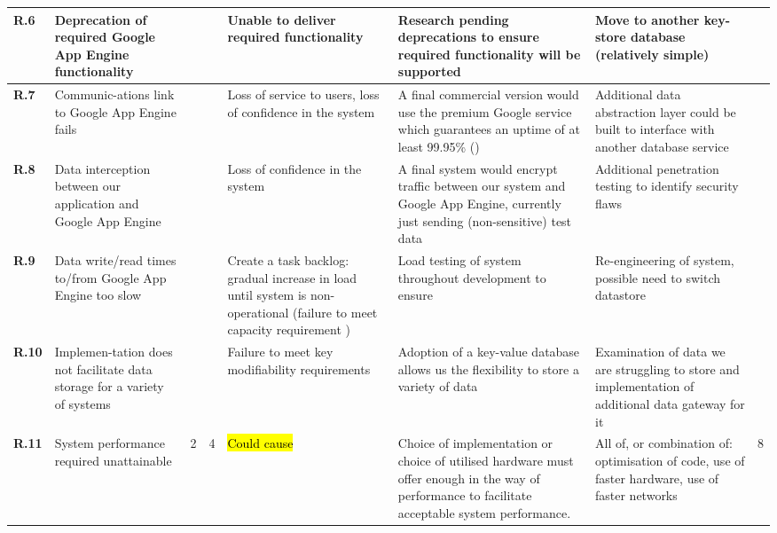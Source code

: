 \begin{longtable}[H]{| p{0.65cm} | p{2cm} | p{0.3cm} | p{0.3cm} | p{2.4cm} | p{3cm} | p{2.7cm} | p{0.4cm} |}
  \hline \textbf{R.6}
  & Deprecation of required Google App Engine functionality
  & 
  & 
  & Unable to deliver required functionality
  & Research pending deprecations to ensure required functionality will be supported
  & Move to another key-store database (relatively simple)
  & \\
  
  
  \hline \textbf{R.7}
  & Communic-ations link to Google App Engine fails
  & 
  & 
  & Loss of service to users, loss of confidence in the system
  & A final commercial version would use the premium Google service which guarantees an uptime of at least 99.95\% (\nfrit10)
  & Additional data abstraction layer could be built to interface with another database service
  & \\
  
  \hline \textbf{R.8}
  & Data interception between our application and Google App Engine 
  & 
  & 
  & Loss of confidence in the system
  & A final system would encrypt traffic between our system and Google App Engine, currently just sending (non-sensitive) test data
  & Additional penetration testing to identify security flaws
  & \\
  
  \hline \textbf{R.9}
  & Data write/read times to/from Google App Engine too slow
  & 
  & 
  & Create a task backlog: gradual increase in load until system
  is non-operational (failure to meet capacity requirement \nfrit9)
  & Load testing of system throughout development to ensure \nfrit9
  & Re-engineering of system, possible need to switch datastore
  & \\
  
  \hline \textbf{R.10}
  & Implemen-tation does not facilitate data storage for a variety of systems
  & 
  & 
  & Failure to meet key modifiability requirements 
  & Adoption of a key-value database allows us the flexibility to store a variety of data
  & Examination of data we are struggling to store and implementation of additional data gateway for it
  & \\  
  
  \hline \textbf{R.11}
  & System performance required unattainable
  & 2
  & 4
  & \hl{Could cause }
  & Choice of implementation or choice of utilised hardware must offer
  enough in the way of performance to facilitate acceptable system
  performance.
  & All of, or combination of: optimisation of code, use of faster
  hardware, use of faster networks
  & 8 \\    
  

\end{longtable}
